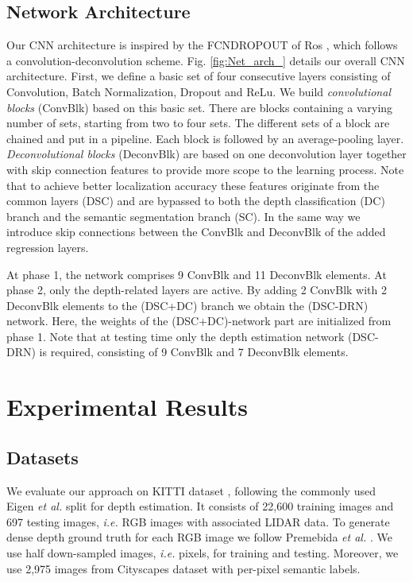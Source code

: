 \documentclass[letterpaper, 10 pt, conference]{ieeeconf}
\newcommand{\ie}{{\em i.e.}}
\newcommand{\etal}{{\em et al.}}
\newcommand{\Fig}[1]{Fig. \ref{fig:#1}}
\begin{document}
\subsection{Network Architecture}
 
Our CNN architecture is inspired by the FCNDROPOUT of Ros \cite{Ros:2016}, which follows a convolution-deconvolution scheme. \Fig{Net_arch_} details our overall CNN architecture. First, we define a basic set of four consecutive layers consisting of Convolution, Batch Normalization, Dropout and ReLu. We build \emph{convolutional blocks} (ConvBlk) based on this basic set. There are blocks containing a varying number of sets, starting from two to four sets. The different sets of a block are chained and put in a pipeline. Each block is followed by an average-pooling layer. \emph{Deconvolutional blocks} (DeconvBlk) are based on one deconvolution layer together with skip connection features to provide more scope to the  learning process. Note that to achieve better localization accuracy these features originate from the common layers (DSC) and are bypassed to both the depth classification (DC) branch and the semantic segmentation branch (SC). In the same way we introduce skip connections between the ConvBlk and DeconvBlk of the added regression layers. 

At phase 1, the network comprises 9 ConvBlk and 11 DeconvBlk elements. At phase 2, only the depth-related layers are active. By adding 2 ConvBlk with 2 DeconvBlk elements to the (DSC+DC) branch we obtain the (DSC-DRN) network. Here, the weights of the (DSC+DC)-network part are initialized from phase 1. Note that at testing time only the depth estimation network (DSC-DRN) is required, consisting of 9 ConvBlk and 7 DeconvBlk elements. 



 
\section{Experimental Results}
\label{sec:experiments}

\subsection{Datasets}

We evaluate our approach on KITTI dataset \cite{Geiger:2013}, following the commonly used Eigen {\etal} \cite{Eigen:2014} split for depth estimation. It consists of 22,600 training images and 697 testing images, {\ie} RGB images with associated LIDAR data. To generate dense depth ground truth for each RGB image we follow Premebida {\etal} \cite{Premebida:2014}. We use half down-sampled images, {\ie}  pixels, for training and testing. Moreover, we use 2,975 images from Cityscapes dataset \cite{Cordts:2016} with per-pixel semantic labels. 
\end{document}
